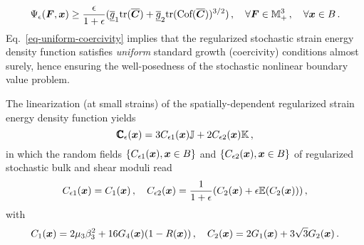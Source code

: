 \begin{equation}\label{eq-uniform-coercivity}
    \Psi_{\epsilon}(\boldsymbol{F}, \boldsymbol{x}) \geq \frac{\epsilon}{1+\epsilon}(\underline{\overline{g}}_1 \textnormal{tr}(\overline{\boldsymbol{C}}) + \underline{\overline{g}}_2 \textnormal{tr}(\text{Cof}(\overline{\boldsymbol{C}}))^{3/2})\,,\quad \forall \boldsymbol{F} \in \mathbb{M}_+^3\,, \quad \forall \boldsymbol{x} \in B\,.
\end{equation}
Eq.~\eqref{eq-uniform-coercivity} implies that the regularized stochastic strain energy density function satisfies \textit{uniform} standard growth (coercivity) conditions almost surely, hence ensuring the well-posedness of the stochastic nonlinear boundary value problem.

The linearization (at small strains) of the spatially-dependent regularized strain energy density function yields  
\begin{equation}
    \pmb{\mathbb{C}}_{\epsilon}(\boldsymbol{x}) = 3 C_{\epsilon 1}(\boldsymbol{x}) \mathbb{J} + 2 C_{\epsilon 2}(\boldsymbol{x})\mathbb{K}\,,
\end{equation}
in which the random fields $\{C_{\epsilon 1}(\boldsymbol{x}), \boldsymbol{x} \in B\}$ and $\{C_{\epsilon 2}(\boldsymbol{x}), \boldsymbol{x} \in B\}$ of regularized stochastic bulk and shear moduli read
\begin{equation}
    C_{\epsilon 1}(\boldsymbol{x}) = C_1(\boldsymbol{x})\,, \quad C_{\epsilon 2}(\boldsymbol{x}) = \frac{1}{1+\epsilon}(C_2(\boldsymbol{x}) + \epsilon \mathbb{E}(C_2(\boldsymbol{x})))\,,
\end{equation}
with
\begin{equation}
    C_{1}(\boldsymbol{x}) = 2 \mu_3 \beta_3^2 + 16 G_4(\boldsymbol{x})(1 - R(\boldsymbol{x}))\,, \quad C_{2}(\boldsymbol{x}) = 2G_1(\boldsymbol{x})+3\sqrt{3}G_2(\boldsymbol{x})\,.
\end{equation}

